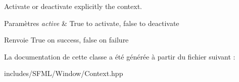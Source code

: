 Activate or deactivate explicitly the context. 


\begin{DoxyParams}{Paramètres}
{\em active} & True to activate, false to deactivate\\
\hline
\end{DoxyParams}
\begin{DoxyReturn}{Renvoie}
True on success, false on failure 
\end{DoxyReturn}


La documentation de cette classe a été générée à partir du fichier suivant \+:\begin{DoxyCompactItemize}
\item 
includes/\+S\+F\+M\+L/\+Window/Context.\+hpp\end{DoxyCompactItemize}
